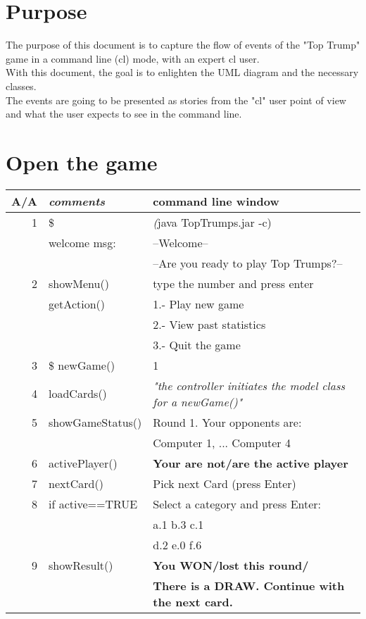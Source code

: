 \documentclass[a4paper, 12pt]{article}
\begin{document}
\section*{Purpose}
The purpose of this document is to capture the flow of events of the "Top Trump" game in a command line (cl) mode, with an expert cl user.\\
With this document, the goal is to enlighten the UML diagram and the necessary classes.\\
The events are going to be presented as stories from the "cl" user point of view and what the user expects to see in the command line. 

\section{Open the game}
\begin{tabular}{r | l p{8cm}}
A/A&\textit{comments} & \textbf{command line window}\\
\hline
1&\$ & \textit(java TopTrumps.jar -c)\\ \hline
&welcome msg: &--Welcome-- 
\\&&--Are you ready to play Top Trumps?--
\\ \hline
2&showMenu()& type the number and press enter \\&getAction()&
1.- Play new game \\& &
2.- View past statistics \\&&
3.- Quit the game \\ \hline 
3&\$ newGame() & 1\\
4&loadCards() & \textit{"the controller initiates the model class for a newGame()"}\\ \hline
5&showGameStatus()& Round 1. Your opponents are:\\&& Computer 1, ... Computer 4\\
6&activePlayer()& \textbf{Your are not/are the active player}\\
7&nextCard()& Pick next Card (press Enter)\\ \hline 
8&if active==TRUE& Select a category and press Enter:\\
&& a.1  b.3  c.1 \\& &d.2  e.0  f.6\\ \hline 
9&showResult()& \textbf{You WON/lost this round/}\\ &&\textbf{There is a DRAW. Continue with the next card.}
\end{tabular}
\\
\end{document}

